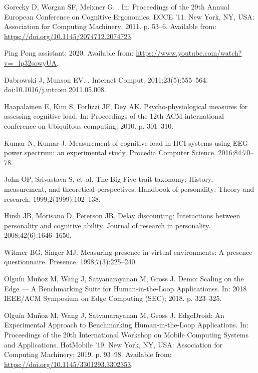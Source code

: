 \documentclass[10pt,letterpaper]{article}
\begin{document}
\begin{thebibliography}{10}
  Gorecky D, Worgan SF, Meixner G.
  .
  \newblock In: Proceedings of the 29th Annual European Conference on Cognitive
    Ergonomics. ECCE '11. New York, NY, USA: Association for Computing Machinery;
    2011. p. 53--6.
  \newblock Available from: \url{https://doi.org/10.1145/2074712.2074723}.
  
  {Ping Pong assistant}; 2020.
  \newblock Available from: \url{https://www.youtube.com/watch?v=_lp32sowyUA}.
  
  Dabrowski J, Munson EV.
  .
  \newblock Interact Comput. 2011;23(5):555–564.
  \newblock doi:{10.1016/j.intcom.2011.05.008}.
  
  Haapalainen E, Kim S, Forlizzi JF, Dey AK.
  \newblock Psycho-physiological measures for assessing cognitive load.
  \newblock In: Proceedings of the 12th ACM international conference on
    Ubiquitous computing; 2010. p. 301--310.
  
  Kumar N, Kumar J.
  \newblock Measurement of cognitive load in {HCI} systems using {EEG} power
    spectrum: an experimental study.
  \newblock Procedia Computer Science. 2016;84:70--78.
  
  John OP, Srivastava S, et~al.
  \newblock The Big Five trait taxonomy: History, measurement, and theoretical
    perspectives.
  \newblock Handbook of personality: Theory and research. 1999;2(1999):102--138.
  
  Hirsh JB, Morisano D, Peterson JB.
  \newblock Delay discounting: Interactions between personality and cognitive
    ability.
  \newblock Journal of research in personality. 2008;42(6):1646--1650.
  
  Witmer BG, Singer MJ.
  \newblock Measuring presence in virtual environments: A presence questionnaire.
  \newblock Presence. 1998;7(3):225--240.
  
  {Olguín Muñoz} M, {Wang} J, {Satyanarayanan} M, {Gross} J.
  \newblock Demo: Scaling on the Edge --- A Benchmarking Suite for
    Human-in-the-Loop Applicationss.
  \newblock In: 2018 IEEE/ACM Symposium on Edge Computing (SEC); 2018. p.
    323--325.
  
  {Olguín Muñoz} M, Wang J, Satyanarayanan M, Gross J.
  \newblock EdgeDroid: An Experimental Approach to Benchmarking Human-in-the-Loop
    Applications.
  \newblock In: Proceedings of the 20th International Workshop on Mobile
    Computing Systems and Applications. HotMobile '19. New York, NY, USA:
    Association for Computing Machinery; 2019. p. 93–98.
  \newblock Available from: \url{https://doi.org/10.1145/3301293.3302353}.
  

\end{thebibliography}
\end{document}
